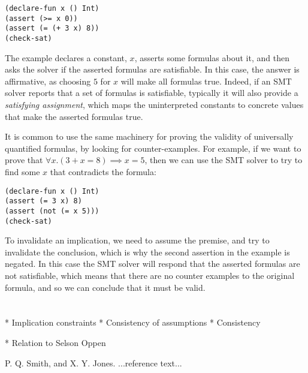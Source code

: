 \documentclass{sigplanconf}
\begin{document}
\begin{Verbatim}
(declare-fun x () Int)
(assert (>= x 0))
(assert (= (+ 3 x) 8))
(check-sat)
\end{Verbatim}

The example declares a constant, $x$, asserts some formulas
about it, and then asks the solver if the asserted formulas are
satisfiable.  In this case, the answer is affirmative, as choosing
$5$ for $x$ will make all formulas true.  Indeed, if an
SMT solver reports that a set of formulas is satisfiable, typically
it will also provide a {\em satisfying assignment}, which maps
the uninterpreted constants to concrete values that make the
asserted formulas true.

It is common to use the same machinery for proving the validity of
universally quantified formulas, by looking for counter-examples.
For example, if we want to prove that $\forall x. (3 + x = 8) \implies x = 5$,
then we can use the SMT solver to try to find some $x$ that contradicts
the formula:

\begin{Verbatim}
(declare-fun x () Int)
(assert (= 3 x) 8)
(assert (not (= x 5)))
(check-sat)
\end{Verbatim}

To invalidate an implication, we need to assume the premise, and try to
invalidate the conclusion, which is why the second assertion in the
example is negated. In this case the SMT solver will respond that the
asserted formulas are not satisfiable, which means that there are no
counter examples to the original formula, and so we can conclude that
it must be valid.



\section{}

  * Implication constraints
  * Consistency of assumptions
  * Consistency 


  * Relation to Selson Oppen













\begin{thebibliography}{}
\softraggedright

P. Q. Smith, and X. Y. Jones. ...reference text...

\end{thebibliography}
\end{document}
